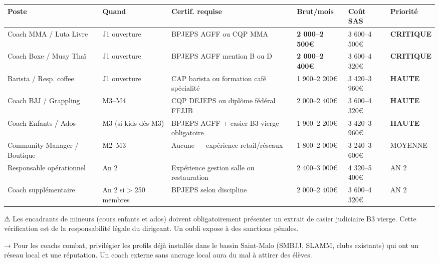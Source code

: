 \documentclass[11pt, a4paper]{article}
\newcommand{\redcell}[1]{\textcolor{fc-red}{\textbf{#1}}}
\newcommand{\goldcell}[1]{\textcolor{fc-gold}{\textbf{#1}}}
\begin{document}
\begin{center}
\begin{tabular}{@{}p{3cm}p{1.5cm}p{2.5cm}p{2cm}p{2cm}p{1.8cm}@{}}
\toprule
\rowcolor{fc-ink}\color{white}\textbf{Poste} & \color{white}\textbf{Quand} & \color{white}\textbf{Certif. requise} & \color{white}\textbf{Brut/mois} & \color{white}\textbf{Coût SAS} & \color{white}\textbf{Priorité} \\
\midrule
Coach MMA / Luta Livre & J1 ouverture & BPJEPS AGFF ou CQP MMA & \redcell{2 000–2 500€} & 3 600–4 500€ & \redcell{CRITIQUE} \\
\rowcolor{fc-bg2} Coach Boxe / Muay Thaï & J1 ouverture & BPJEPS AGFF mention B ou D & \redcell{2 000–2 400€} & 3 600–4 320€ & \redcell{CRITIQUE} \\
Barista / Resp. coffee & J1 ouverture & CAP barista ou formation café spécialité & 1 900–2 200€ & 3 420–3 960€ & \goldcell{HAUTE} \\
\rowcolor{fc-bg2} Coach BJJ / Grappling & M3–M4 & CQP DEJEPS ou diplôme fédéral FFJJB & 2 000–2 400€ & 3 600–4 320€ & \goldcell{HAUTE} \\
Coach Enfants / Ados & M3 (si kids dès M3) & BPJEPS AGFF + casier B3 vierge obligatoire & 1 900–2 200€ & 3 420–3 960€ & \goldcell{HAUTE} \\
\rowcolor{fc-bg2} Community Manager / Boutique & M2–M3 & Aucune — expérience retail/réseaux & 1 800–2 000€ & 3 240–3 600€ & MOYENNE \\
Responsable opérationnel & An 2 & Expérience gestion salle ou restauration & 2 400–3 000€ & 4 320–5 400€ & AN 2 \\
\rowcolor{fc-bg2} Coach supplémentaire & An 2 si > 250 membres & BPJEPS selon discipline & 2 000–2 400€ & 3 600–4 320€ & AN 2 \\
\bottomrule
\end{tabular}
\end{center}

\begin{warnbox}
⚠ Les encadrants de mineurs (cours enfants et ados) doivent obligatoirement présenter un extrait de casier judiciaire B3 vierge. Cette vérification est de la responsabilité légale du dirigeant. Un oubli expose à des sanctions pénales.
\end{warnbox}

\begin{tipbox}
→ Pour les coachs combat, privilégier les profils déjà installés dans le bassin Saint-Malo (SMBJJ, SLAMM, clubs existants) qui ont un réseau local et une réputation. Un coach externe sans ancrage local aura du mal à attirer des élèves.
\end{tipbox}
\end{document}
